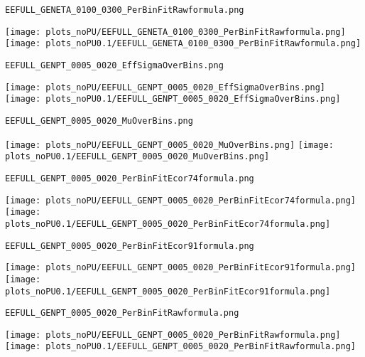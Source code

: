 \begin{frame}[fragile]
\begin{verbatim}
EEFULL_GENETA_0100_0300_PerBinFitRawformula.png
\end{verbatim}
\texttt{[image: plots\_noPU/EEFULL\_GENETA\_0100\_0300\_PerBinFitRawformula.png]}
\texttt{[image: plots\_noPU0.1/EEFULL\_GENETA\_0100\_0300\_PerBinFitRawformula.png]}
\end{frame}
\begin{frame}[fragile]
\begin{verbatim}
EEFULL_GENPT_0005_0020_EffSigmaOverBins.png
\end{verbatim}
\texttt{[image: plots\_noPU/EEFULL\_GENPT\_0005\_0020\_EffSigmaOverBins.png]}
\texttt{[image: plots\_noPU0.1/EEFULL\_GENPT\_0005\_0020\_EffSigmaOverBins.png]}
\end{frame}
\begin{frame}[fragile]
\begin{verbatim}
EEFULL_GENPT_0005_0020_MuOverBins.png
\end{verbatim}
\texttt{[image: plots\_noPU/EEFULL\_GENPT\_0005\_0020\_MuOverBins.png]}
\texttt{[image: plots\_noPU0.1/EEFULL\_GENPT\_0005\_0020\_MuOverBins.png]}
\end{frame}
\begin{frame}[fragile]
\begin{verbatim}
EEFULL_GENPT_0005_0020_PerBinFitEcor74formula.png
\end{verbatim}
\texttt{[image: plots\_noPU/EEFULL\_GENPT\_0005\_0020\_PerBinFitEcor74formula.png]}
\texttt{[image: plots\_noPU0.1/EEFULL\_GENPT\_0005\_0020\_PerBinFitEcor74formula.png]}
\end{frame}
\begin{frame}[fragile]
\begin{verbatim}
EEFULL_GENPT_0005_0020_PerBinFitEcor91formula.png
\end{verbatim}
\texttt{[image: plots\_noPU/EEFULL\_GENPT\_0005\_0020\_PerBinFitEcor91formula.png]}
\texttt{[image: plots\_noPU0.1/EEFULL\_GENPT\_0005\_0020\_PerBinFitEcor91formula.png]}
\end{frame}
\begin{frame}[fragile]
\begin{verbatim}
EEFULL_GENPT_0005_0020_PerBinFitRawformula.png
\end{verbatim}
\texttt{[image: plots\_noPU/EEFULL\_GENPT\_0005\_0020\_PerBinFitRawformula.png]}
\texttt{[image: plots\_noPU0.1/EEFULL\_GENPT\_0005\_0020\_PerBinFitRawformula.png]}
\end{frame}
